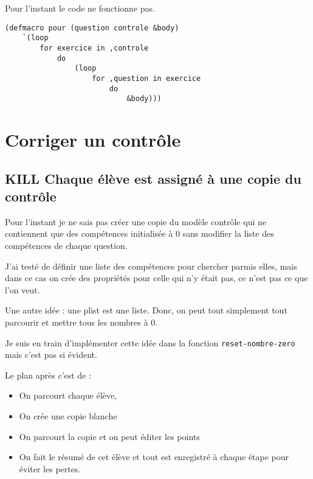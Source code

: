 \documentclass[a4paper, 11pt, DIV=18]{scrartcl}
\begin{document}
Pour l'instant le code ne fonctionne pas.
\begin{verbatim}
(defmacro pour (question controle &body)
    `(loop
        for exercice in ,controle
            do
                (loop
                    for ,question in exercice
                        do
                            &body)))
\end{verbatim}

\section{Corriger un contrôle}
\label{sec:orgf02db5d}

\subsection{{\bfseries\sffamily KILL} Chaque élève est assigné à une copie du contrôle}
\label{sec:org48fa68c}
Pour l'instant je ne sais pas créer une copie du modèle contrôle qui ne
contiennent que des compétences initialisée à \(0\) sans modifier la liste des
compétences de chaque question.

J'ai testé de définir une liste des compétences pour chercher parmis elles, mais
dans ce cas on crée des propriétés pour celle qui n'y était pas, ce n'est pas ce
que l'on veut.

Une autre idée : une plist est une liste. Donc, on peut tout simplement tout
parcourir et mettre tous les nombres à 0.

Je suis en train d'implémenter cette idée dans la fonction \texttt{reset-nombre-zero}
mais c'est pas si évident.

Le plan après c'est de :

\begin{itemize}
\item On parcourt chaque élève,
\item On crée une copie blanche
\item On parcourt la copie et on peut éditer les points
\item On fait le résumé de cet élève et tout est enregistré à chaque étape pour
éviter les pertes.
\end{itemize}
\end{document}
